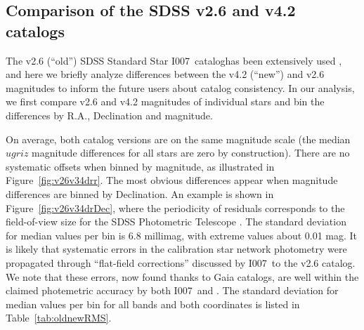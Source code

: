 \documentclass[fleqn,usenatbib]{mnras}
\newcommand{\pO}{\hbox{I007}}
\newcommand{\pOc}{\hbox{I007 catalog}}
\begin{document}

\subsection{Comparison of the SDSS v2.6 and v4.2 catalogs \label{sec:v26v42}} 

The v2.6 (``old'') SDSS Standard Star \pOc has been extensively used 
\citep[e.g.,][]{2008AJ....135..338F},
and here we briefly analyze differences between the v4.2 (``new'') and v2.6 magnitudes
to inform the future users about catalog consistency. 
In our analysis, we first compare v2.6 and v4.2 magnitudes of individual stars and 
bin the differences by R.A., Declination and magnitude. 

On average, both catalog versions are on the same magnitude scale (the median $ugriz$ 
magnitude differences for all stars are zero by construction). There are no systematic offsets 
when binned by magnitude, as illustrated in Figure~\ref{fig:v26v34drr}. The most obvious 
differences appear when magnitude differences are binned by Declination. An example is 
shown in Figure~\ref{fig:v26v34drDec}, where the periodicity of residuals corresponds to the 
field-of-view size for the SDSS Photometric Telescope \citep{2006AN....327..821T}. 
The standard deviation for median values per bin is 6.8 millimag, with extreme values about 
0.01 mag. It is likely that systematic errors in the calibration star network photometry 
were propagated through ``flat-field corrections'' discussed by \pO\ to the v2.6 catalog.
We note that these errors, now found thanks to Gaia catalogs, are well within the claimed
photemetric accuracy by both \pO\ and \cite{2002AJ....123.2121S}. The standard deviation 
for median values per bin for all bands and both coordinates is listed in Table~\ref{tab:oldnewRMS}. 


   
\end{document}
